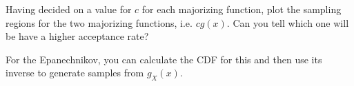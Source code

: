\documentclass[11pt]{article}
\begin{document}
\begin{itemize}
 Having decided on a value for $c$ for each majorizing function, plot
 the sampling regions for the two majorizing functions, i.e. $c g(x)$.
 Can you tell which one will be have a higher acceptance rate?

 For the Epanechnikov, you can calculate the CDF for this and then use
 its inverse to generate samples from $g_X(x)$.  

\end{itemize}
\end{document}
